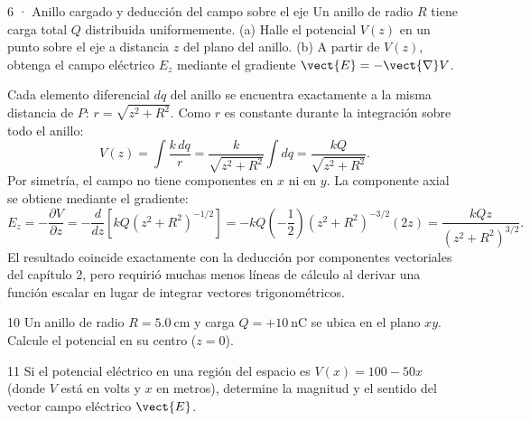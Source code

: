 \documentclass[11pt]{article}
\begin{document}
\begin{eResuelto}{6 · Anillo cargado y deducción del campo sobre el eje}
Un anillo de radio $R$ tiene carga total $Q$ distribuida uniformemente. (a) Halle el potencial $V(z)$ en un punto sobre el eje a distancia $z$ del plano del anillo. (b) A partir de $V(z)$, obtenga el campo eléctrico $E_z$ mediante el gradiente $\vect{E}=-\vect{\nabla}V$.
\begin{center}
\end{center}
Cada elemento diferencial $dq$ del anillo se encuentra exactamente a la misma distancia de $P$: $r=\sqrt{z^2+R^2}$. Como $r$ es constante durante la integración sobre todo el anillo:
\[ V(z) = \int \frac{k\,dq}{r} = \frac{k}{\sqrt{z^2+R^2}}\int dq = \frac{kQ}{\sqrt{z^2+R^2}}. \]
Por simetría, el campo no tiene componentes en $x$ ni en $y$. La componente axial se obtiene mediante el gradiente:
\[ E_z = -\frac{\partial V}{\partial z} = -\frac{d}{dz}\left[kQ(z^2+R^2)^{-1/2}\right] = -kQ\left(-\frac{1}{2}\right)(z^2+R^2)^{-3/2}(2z) = \frac{kQz}{(z^2+R^2)^{3/2}}. \]
El resultado coincide exactamente con la deducción por componentes vectoriales del capítulo 2, pero requirió muchas menos líneas de cálculo al derivar una función escalar en lugar de integrar vectores trigonométricos.
\end{eResuelto}

\begin{eReto}{10 }
Un anillo de radio $R=\SI{5,0}{\centi\metre}$ y carga $Q=+\SI{10}{\nano\coulomb}$ se ubica en el plano $xy$. Calcule el potencial en su centro ($z=0$).
\end{eReto}

\begin{eReto}{11 }
Si el potencial eléctrico en una región del espacio es $V(x)=100 - 50x$ (donde $V$ está en volts y $x$ en metros), determine la magnitud y el sentido del vector campo eléctrico $\vect{E}$.
\end{eReto}
\end{document}
